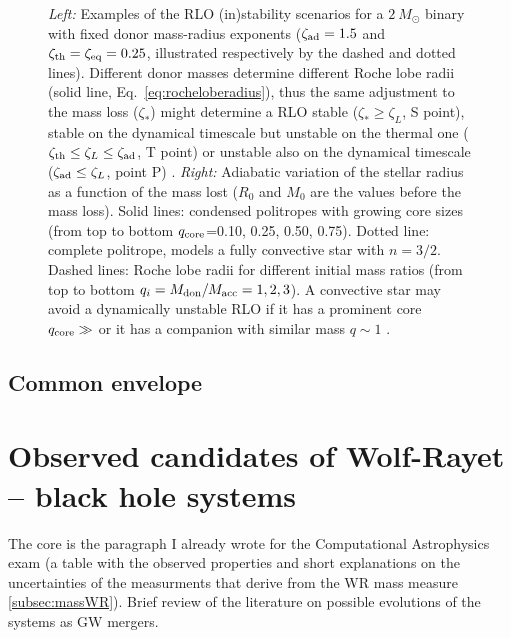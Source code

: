 \documentclass[a4paper,titlepage]{book}     	%
\newcommand{\sun}{\ensuremath{_\odot}}
\newcommand{\msun}{\ensuremath{M\sun}}
\begin{document}
\begin{figure}[h]
\begin{minipage}{.49\textwidth}
	\end{minipage}
	\caption{\emph{Left:} Examples of the RLO (in)stability scenarios for a $\SI{2}{\msun}$ binary with fixed donor mass-radius exponents ($\zeta_\textup{ad}=1.5$ and $\zeta_\textup{th}=\zeta_\textup{eq}=0.25$, illustrated respectively by the dashed and dotted lines). Different donor masses determine different Roche lobe radii (solid line, Eq.\ \ref{eq:rocheloberadius}), thus the same adjustment to the mass loss ($\zeta_*$) might determine a RLO stable ($\zeta_* \geq \zeta_L$, S point), stable on the dynamical timescale but unstable on the thermal one ($\zeta_\textup{th} \leq \zeta_L \leq \zeta_\textup{ad}$, T point) or unstable also on the dynamical timescale ($\zeta_\textup{ad} \leq \zeta_L$, point P) \cite{binaries}. \emph{Right:} Adiabatic variation of the stellar radius as a function of the mass lost ($R_0$ and $M_0$ are the values before the mass loss). Solid lines: condensed politropes with growing core sizes (from top to bottom $q_\textup{core}$=0.10, 0.25, 0.50, 0.75). Dotted line: complete politrope, models a fully convective star with $n=3/2$. Dashed lines: Roche lobe radii for different initial mass ratios (from top to bottom $q_i=M_{\rm don}/M_{\rm acc}=1,2,3$). A convective star may avoid a dynamically unstable RLO if it has a prominent core $q_{\rm core} \gg$ or it has a companion with similar mass $q \sim 1$ \cite{hjellmingwebbink1987_coreRLOF}.}\label{fig:RLOstability}
\end{figure}





\subsection{Common envelope}\label{subsec:Commonenvelope}



\section{Observed candidates of Wolf-Rayet -- black hole systems}\label{sec:WRBHobserved}
The core is the paragraph I already wrote for the Computational Astrophysics exam (a table with the observed properties and short explanations on the uncertainties of the measurments that derive from the WR mass measure \ref{subsec:massWR}). Brief review of the literature on possible evolutions of the systems as GW mergers.\\
\end{document}
